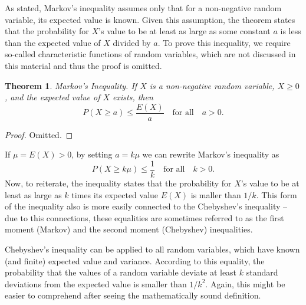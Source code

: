 \documentclass[12pt,a4paper,leqno]{report}
\theoremstyle{plain}
\newtheorem{lause}[equation]{Theorem}
\theoremstyle{definition}
\begin{document}
As stated, Markov's inequality assumes only that for a non-negative random variable, its expected value is known. Given this assumption, the theorem states that the probability for $X$'s value to be at least as large as some constant $a$ is less than the expected value of $X$ divided by $a$. To prove this inequality, we require so-called characteristic functions of random variables, which are not discussed in this material and thus the proof is omitted.

\begin{lause} Markov's Inequality. If $X$ is a non-negative random variable, $X \geq 0$, and the expected value of $X$ exists, then
\[
P(X \geq a) \leq \frac{E(X)}{a} \quad \text{for all} \quad a > 0.
\]
\end{lause}
\begin{proof}
Omitted.
\end{proof}


If $\mu = E(X) > 0$, by setting $a=k\mu$ we can rewrite Markov's inequality as 
\[
P(X \geq k\mu) \leq \frac{1}{k} \quad \text{for all} \quad k > 0.
\]
Now, to reiterate, the inequality states that the probability for $X$'s value to be at least as large as $k$ times its expected value $E(X)$ is maller than $1/k$. This form of the inequality also is more easily connected to the Chebyshev's inequality -- due to this connections, these equalities are sometimes referred to as the first moment (Markov) and the second moment (Chebyshev) inequalities.

Chebyshev's inequality can be applied to all random variables, which have known (and finite) expected value and variance. According to this equality, the probability that the values of a random variable deviate at least $k$ standard deviations from the expected value is smaller than $1/k^2$. Again, this might be easier to comprehend after seeing the mathematically sound definition.
\end{document}
